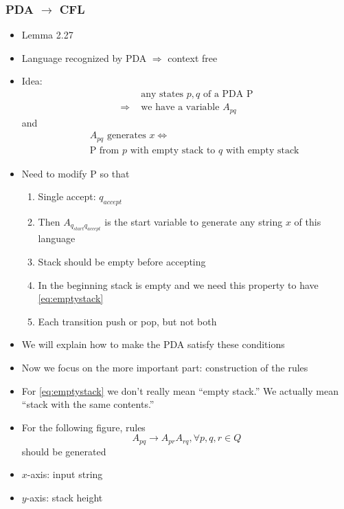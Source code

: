 




\begin{frame}[allowframebreaks]
  \frametitle{PDA $\rightarrow$ CFL}
  \begin{itemize}
\item Lemma 2.27
\item Language recognized by PDA
$\Rightarrow$ context free
\item Idea:
  \begin{equation*}
    \begin{split}
& \text{ any states } p,q \text{ of a PDA P} \\
\Rightarrow & \text{ we have a variable } A_{pq}
\end{split}
\end{equation*}
and
\begin{eqnarray}
&& \mbox{$A_{pq}$ generates $x
\Leftrightarrow$}  \label{eq:emptystack} \\ 
&& \mbox{P from $p$ with empty
stack to $q$ with empty stack}
\nonumber
\end{eqnarray}
\item Need to modify P so that

  \begin{enumerate}
  \item Single accept: $q_{accept}$

  \item [] Then  $A_{q_{start} q_{accept}}$
    is the start variable to generate any string $x$
    of this language
  \item Stack should be empty before accepting
  \item [] In the beginning stack is empty and we need this property to
    have \eqref{eq:emptystack}
  \item Each transition push or pop, but not both
  \end{enumerate}

\item We will explain how to make the PDA satisfy these conditions

\item Now we focus on the more important part: construction of the rules

\item For \eqref{eq:emptystack} we don't really mean
  ``empty stack.'' We actually mean ``stack with the same
  contents.''
\item For the following figure, rules
  \begin{equation*}
    A_{pq} \rightarrow A_{pr} A_{rq}, \forall p, q, r \in Q
  \end{equation*}
should be generated
\item $x$-axis: input string
\item [] $y$-axis: stack height
  

\end{itemize}
\end{frame}

